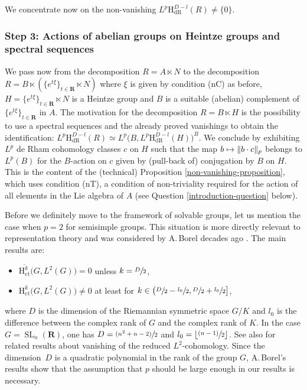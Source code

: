 \documentclass[JEP,XML,SOM,Unicode,published]{cedram}
\newcommand{\psfrac}[2]{\sfrac{(#1)}{#2}}
\newcommand\mto{\mathchoice{\longmapsto}{\mapsto}{\mapsto}{\mapsto}}
\newcommand{\ct}{\mathrm{ct}}
\newcommand{\dR}{\mathrm{dR}}
\newcommand{\rH}{\mathrm{H}}
\newcommand{\RR}{\mathbf{R}}
\theoremstyle{plain}
\theoremstyle{remark}
\theoremstyle{definition}
\DeclareMathOperator{\SL}{SL}
\begin{document}
We concentrate now on the non-vanishing $L^p\rH^{D-l}_\dR(R) \neq \{0 \}$.

\subsubsection*{Step 3: Actions of abelian groups on Heintze groups and spectral sequences}
We pass now from the decomposition $R = A \ltimes N$ to the decomposition $R = B \ltimes (\{ e^{t\xi} \}_{t \in \RR} \ltimes N)$ where $\xi$ is given by condition (nC) as before, $H = \{ e^{t\xi} \}_{t \in \RR} \ltimes N$ is a Heintze group and $B$ is a suitable (abelian) complement of $\{ e^{t\xi} \}_{t \in \RR}$ in $A$.
The motivation for the decomposition $R = B \ltimes H$ is the possibility to use a spectral sequences and the already proved vanishings to obtain the identification:
$L^p\rH^{D-l}_\dR(R) \simeq L^p \bigl(B , L^p\rH^{D-l}_\dR(H) \bigr)^B$.
We conclude by exhibiting $L^p$ de Rham cohomology classes $c$ on $H$ such that the map $b \mto \Vert b \cdot c \Vert_p$ belongs to $L^p(B)$ for the $B$-action on $c$ given by (pull-back of) conjugation by $B$ on $H$.
This is the content of the (technical) Proposition \ref{non-vanishing-proposition}, which uses condition (nT), a condition of non-triviality required for the action of all elements in the Lie algebra of $A$ (see Question \ref{introduction-question} below).

Before we definitely move to the framework of solvable groups, let us mention the case when $p=2$ for semisimple groups.
This situation is more directly relevant to representation theory and was considered by A.\,Borel decades ago \cite{Borel}.
The main results are:
\begin{itemize}
\item $\overline{\rH^k_\ct} \bigl(G, L^2(G) \bigr) = 0$ unless $k = \sfrac{D}{2}$,
\item $\rH^k_\ct \bigl(G, L^2(G) \bigr) \neq 0$ at least for $k \in \bigl(\sfrac{D}{2} - \sfrac{l_0}{2}, \sfrac{D}{2} +\sfrac{l_0}{2}\bigr]$,
\end{itemize}
where $D$ is the dimension of the Riemannian symmetric space $G/K$ and $l_0$ is the difference between the complex rank of $G$ and the complex rank of $K$.
In the case $G = \SL_n(\RR)$, one has $D = \psfrac{n^2 + n -2}{2}$ and
$l_0 = \lfloor \psfrac{n-1}{2} \rfloor$.
See also \cite{BFS} for related results about vanishing of the reduced $L^2$-cohomology.
Since the dimension~$D$ is a quadratic polynomial in the rank of the group $G$, A.\,Borel's results show that the assumption that $p$ should be large enough in our results is necessary.
\end{document}
